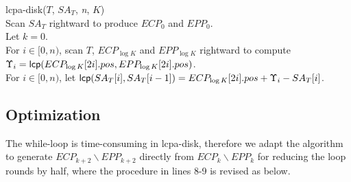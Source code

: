 \documentclass{llncs}
\begin{document}
\begin{algorithm}[hbtp!]
\caption{Compute $K$-Order $LCPA_T$ in Disk}
\label{fig:alg:em}
lcpa-disk($T$, $SA_T$, {\em n}, $K$){\\
\SetAlgoNoLine
Scan $SA_T$ rightward to produce $ECP_0$ and $EPP_0$.\\
Let $k = 0$. \\
\While{$k < \log K$}{
\Indentp{-1em}
Radix-sort $ECP_k$ and $EPP_k$ by $pos$ to produce $IECP_k$ and $IEPP_k$. \\
For $i\in [0,n)$ and $j\in [0,2n)$, scan $T$ rightward to iteratively compute the finger-print of ${\sf pre}(T,i)$ and assign $FP[0,i]$ to $IECP_k[j].fp$ or $IEPP_k[j].fp$ if $IECP_k[j].pos = i$ or $IEPP_k[j].pos = i$. \\
Radix-sort $IECP_k$ and $IEPP_k$ by $idx$ to reproduce $ECP_k$ and $EPP_k$. \\
For $i \in [0,n)$, scan $ECP_k$ and $EPP_k$ rightward to compute and compare each pair of $(FP[ECP_k[2i].pos+1,ECP_k[2i+1].pos], FP[EPP_k[2i].pos+1,EPP_k[2i+1].pos])$ for generating $ECP_{k+1}$ and $EPP_{k+1}$. \\
Let $k = k + 1$. \\
}
For $i \in [0,n)$, scan $T$, $ECP_{\log K}$ and $EPP_{\log K}$ rightward to compute $\Upsilon_i = {\sf lcp}(ECP_{\log K}[2i].pos,EPP_{\log K}[2i].pos)$. \\
For $i \in [0,n)$, let ${\sf lcp}(SA_T[i],SA_T[i-1])=ECP_{\log K}[2i].pos+\Upsilon_i-SA_T[i]$.\\
}
\end{algorithm}

\subsection{Optimization}\label{subsec:optimization}

The while-loop is time-consuming in lcpa-disk, therefore we adapt the algorithm to generate $ECP_{k+2}\backslash EPP_{k+2}$ directly from $ECP_k\backslash EPP_k$ for reducing the loop rounds by half, where the procedure in lines 8-9 is revised as below.
\end{document}
